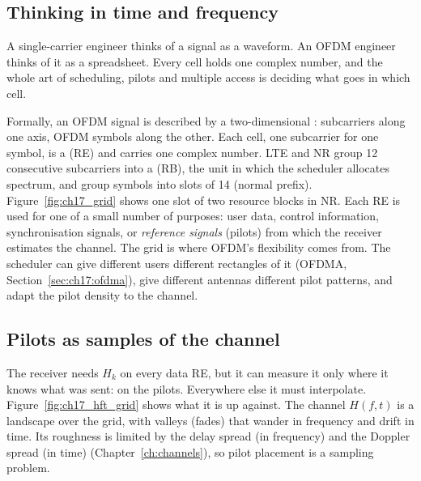 \subsection{Thinking in time and frequency}

A single-carrier engineer thinks of a signal as a waveform. An OFDM engineer thinks of it as a
spreadsheet. Every cell holds one complex number, and the whole art of scheduling, pilots and
multiple access is deciding what goes in which cell.

Formally, an OFDM signal is described by a two-dimensional : subcarriers along
one axis, OFDM symbols along the other. Each cell, one subcarrier for one symbol, is a
 (RE) and carries one complex number. LTE and NR group 12 consecutive subcarriers into a
 (RB), the unit in which the scheduler allocates spectrum, and group symbols into
slots of 14 (normal prefix). Figure~\ref{fig:ch17_grid} shows one slot of two resource blocks in NR. Each RE
is used for one of a small number of purposes: user data, control information, synchronisation signals,
or \emph{reference signals} (pilots) from which the receiver estimates the channel. The grid is where OFDM's
flexibility comes from. The scheduler can give different users different rectangles of it
(OFDMA, Section~\ref{sec:ch17:ofdma}), give different antennas different pilot patterns, and adapt the
pilot density to the channel.

\subsection{Pilots as samples of the channel}

The receiver needs $H_k$ on every data RE, but it can measure it only where it knows what was
sent: on the pilots. Everywhere else it must interpolate. Figure~\ref{fig:ch17_hft_grid} shows
what it is up against. The channel $H(f,t)$ is a landscape over the grid, with valleys (fades)
that wander in frequency and drift in time. Its roughness is limited by the delay spread (in
frequency) and the Doppler spread (in time) (Chapter~\ref{ch:channels}), so pilot placement is a
sampling problem.


